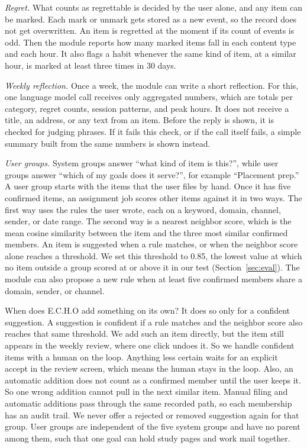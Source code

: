 \documentclass[conference]{IEEEtran}
\begin{document}
\textit{Regret.} What counts as regrettable is decided by the user alone, and any item can be marked. Each mark or unmark gets stored as a new event, so the record does not get overwritten. An item is regretted at the moment if its count of events is odd. Then the module reports how many marked items fall in each content type and each hour. It also flags a habit whenever the same kind of item, at a similar hour, is marked at least three times in 30 days.

\textit{Weekly reflection.} Once a week, the module can write a short reflection. For this, one language model call receives only aggregated numbers, which are totals per category, regret counts, session patterns, and peak hours. It does not receive a title, an address, or any text from an item. Before the reply is shown, it is checked for judging phrases. If it fails this check, or if the call itself fails, a simple summary built from the same numbers is shown instead.

\textit{User groups.} System groups answer ``what kind of item is this?'', while user groups answer ``which of my goals does it serve?'', for example ``Placement prep.'' A user group starts with the items that the user files by hand. Once it has five confirmed items, an assignment job scores other items against it in two ways. The first way uses the rules the user wrote, each on a keyword, domain, channel, sender, or date range. The second way is a nearest neighbor score, which is the mean cosine similarity between the item and the three most similar confirmed members. An item is suggested when a rule matches, or when the neighbor score alone reaches a threshold. We set this threshold to 0.85, the lowest value at which no item outside a group scored at or above it in our test (Section~\ref{sec:eval}). The module can also propose a new rule when at least five confirmed members share a domain, sender, or channel.

When does E.C.H.O add something on its own? It does so only for a confident suggestion. A suggestion is confident if a rule matches and the neighbor score also reaches that same threshold. We add such an item directly, but the item still appears in the weekly review, where one click undoes it. So we handle confident items with a human on the loop. Anything less certain waits for an explicit accept in the review screen, which means the human stays in the loop. Also, an automatic addition does not count as a confirmed member until the user keeps it. So one wrong addition cannot pull in the next similar item. Manual filing and automatic additions pass through the same recorded path, so each membership has an audit trail. We never offer a rejected or removed suggestion again for that group. User groups are independent of the five system groups and have no parent among them, such that one goal can hold study pages and work mail together.
\end{document}
